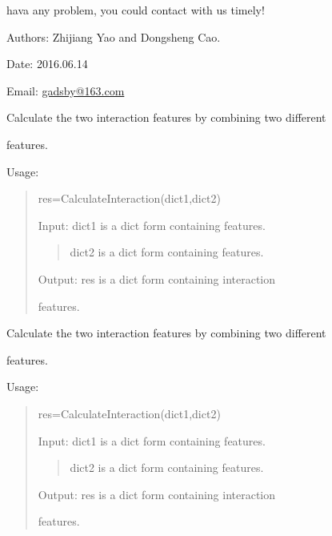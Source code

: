 \documentclass[letterpaper,10pt,english]{sphinxmanual}
\begin{document}
hava any problem, you could contact with us timely!

Authors: Zhijiang Yao and Dongsheng Cao.

Date: 2016.06.14

Email: \href{mailto:gadsby@163.com}{gadsby@163.com}

\begin{fulllineitems}
\label{reference/PyInteraction_module:PyInteraction.CalculateInteraction1}
Calculate the two interaction features by combining two different

features.

Usage:
\begin{quote}

res=CalculateInteraction(dict1,dict2)

Input: dict1 is a dict form containing features.
\begin{quote}

dict2 is a dict form containing features.
\end{quote}

Output: res is a dict form containing interaction

features.
\end{quote}

\end{fulllineitems}


\begin{fulllineitems}
\label{reference/PyInteraction_module:PyInteraction.CalculateInteraction2}
Calculate the two interaction features by combining two different

features.

Usage:
\begin{quote}

res=CalculateInteraction(dict1,dict2)

Input: dict1 is a dict form containing features.
\begin{quote}

dict2 is a dict form containing features.
\end{quote}

Output: res is a dict form containing interaction

features.
\end{quote}

\end{fulllineitems}
\end{document}
